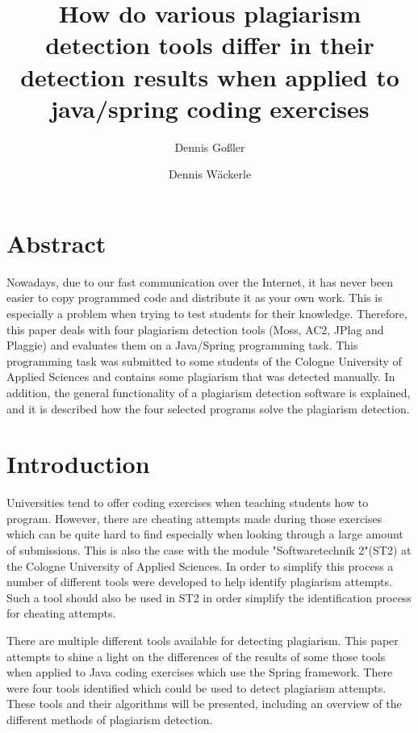 \documentclass[a4paper, 11pt]{article}
\renewcommand{\\}{\vspace*{0.5\baselineskip} \newline}
\begin{document}
\title{How do various plagiarism detection tools differ in their detection results when applied to java/spring coding exercises}
\author{Dennis Goßler \and Dennis Wäckerle}
\maketitle

\section*{Abstract}
Nowadays, due to our fast communication over the Internet, it has never been easier to copy programmed code and distribute it as your own work. This is especially a problem when trying to test students for their knowledge. Therefore, this paper deals with four plagiarism detection tools (Moss, AC2, JPlag and Plaggie) and evaluates them on a Java/Spring programming task. This programming task was submitted to some students of the Cologne University of Applied Sciences and contains some plagiarism that was detected manually. In addition, the general functionality of a plagiarism detection software is explained, and it is described how the four selected programs solve the plagiarism detection.

\newpage
\tableofcontents
\newpage

\section{Introduction}

Universities tend to offer coding exercises when teaching students how to program. However, there are cheating attempts made during those exercises which can be quite hard to find especially when looking through a large amount of submissions. This is also the case with the module "Softwaretechnik 2"(ST2) at the Cologne University of Applied Sciences. In order to simplify this process a number of different tools were developed to help identify plagiarism attempts. Such a tool should also be used in ST2 in order simplify the identification process for cheating attempts.

There are multiple different tools available for detecting plagiarism. This paper attempts to shine a light on the differences of the results of some those tools when applied to Java coding exercises which use the Spring framework. There were four tools identified which could be used to detect plagiarism attempts. These tools and their algorithms will be presented, including an overview of the different methods of plagiarism detection.
\end{document}
